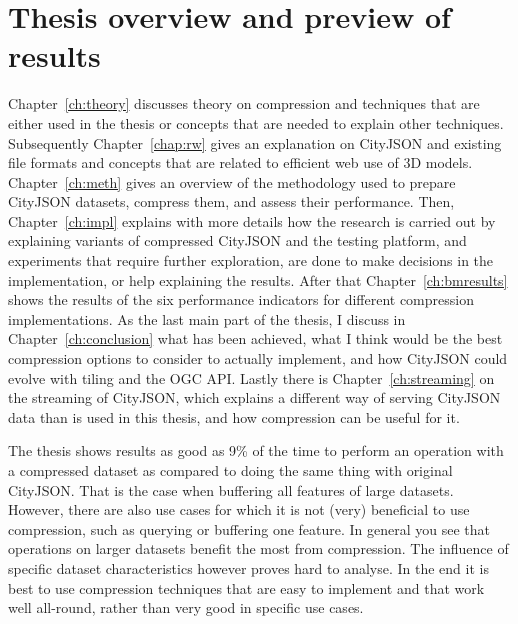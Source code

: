 \section{Thesis overview and preview of results}
Chapter~\ref{ch:theory} discusses theory on compression and techniques that are either used in the thesis or concepts that are needed to explain other techniques.
Subsequently Chapter~\ref{chap:rw} gives an explanation on CityJSON and existing file formats and concepts that are related to efficient web use of 3D models.
Chapter~\ref{ch:meth} gives an overview of the methodology used to prepare CityJSON datasets, compress them, and assess their performance.
Then, Chapter~\ref{ch:impl} explains with more details how the research is carried out by explaining variants of compressed CityJSON and the testing platform, and experiments that require further exploration, are done to make decisions in the implementation, or help explaining the results.
After that Chapter~\ref{ch:bmresults} shows the results of the six performance indicators for different compression implementations.
As the last main part of the thesis, I discuss in Chapter~\ref{ch:conclusion} what has been achieved, what I think would be the best compression options to consider to actually implement, and how CityJSON could evolve with tiling and the OGC API.
Lastly there is Chapter~\ref{ch:streaming} on the streaming of CityJSON, which explains a different way of serving CityJSON data than is used in this thesis, and how compression can be useful for it.

The thesis shows results as good as 9\% of the time to perform an operation with a compressed dataset as compared to doing the same thing with original CityJSON.
That is the case when buffering all features of large datasets.
However, there are also use cases for which it is not (very) beneficial to use compression, such as querying or buffering one feature.
In general you see that operations on larger datasets benefit the most from compression.
The influence of specific dataset characteristics however proves hard to analyse.
In the end it is best to use compression techniques that are easy to implement and that work well all-round, rather than very good in specific use cases.
